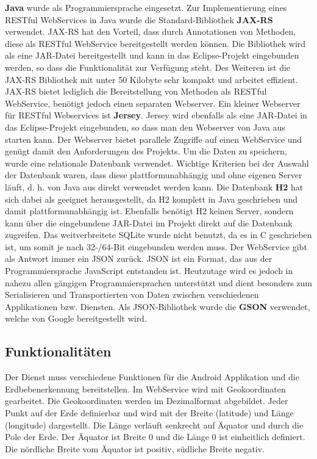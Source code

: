 \textbf{Java} wurde als Programmiersprache eingesetzt. Zur Implementierung eines RESTful WebServices in Java wurde die Standard-Bibliothek \textbf{JAX-RS} verwendet. JAX-RS hat den Vorteil, dass durch Annotationen von Methoden, diese als RESTful WebService bereitgestellt werden können. Die Bibliothek wird als eine JAR-Datei bereitgestellt und kann in das Eclipse-Projekt eingebunden werden, so dass die Funktionalität zur Verfügung steht. Des Weiteren ist die JAX-RS Bibliothek mit unter 50 Kilobyte sehr kompakt und arbeitet effizient. JAX-RS bietet lediglich die Bereitstellung von Methoden als RESTful WebService, benötigt jedoch einen separaten Webserver. Ein kleiner Webserver für RESTful Webservices ist \textbf{Jersey}. Jersey wird ebenfalls als eine JAR-Datei in das Eclipse-Projekt eingebunden, so dass man den Webserver von Java aus starten kann. Der Webserver bietet parallele Zugriffe auf einen WebService und genügt damit den Anforderungen des Projekts. Um die Daten zu speichern, wurde eine relationale Datenbank verwendet. Wichtige Kriterien bei der Auswahl der Datenbank waren, dass diese plattformunabhängig und ohne eigenen Server läuft, d. h. von Java aus direkt verwendet werden kann. Die Datenbank \textbf{H2} hat sich dabei als geeignet herausgestellt, da H2 komplett in Java geschrieben und damit plattformunabhängig ist. Ebenfalls benötigt H2 keinen Server, sondern kann über die eingebundene JAR-Datei im Projekt direkt auf die Datenbank zugreifen. Das weitverbreitete SQLite wurde nicht benutzt, da es in C geschrieben ist, um somit je nach 32-/64-Bit eingebunden werden muss. Der WebService gibt als Antwort immer ein JSON zurück. JSON ist ein Format, das aus der Programmiersprache JavaScript entstanden ist. Heutzutage wird es jedoch in nahezu allen gängigen Programmiersprachen unterstützt und dient besonders zum Serialisieren und Transportierten von Daten zwischen verschiedenen Applikationen bzw. Diensten. Als JSON-Bibliothek wurde die \textbf{GSON} verwendet, welche von Google bereitgestellt wird.


\subsection{Funktionalitäten}
Der Dienst muss verschiedene Funktionen für die Android Applikation und die Erdbebenerkennung bereitstellen. Im WebService wird mit Geokoordinaten gearbeitet. Die Geokoordinaten werden im Dezimalformat abgebildet. Jeder Punkt auf der Erde definierbar und wird mit der Breite (latitude) und Länge (longitude) dargestellt. Die Länge verläuft senkrecht auf Äquator und durch die Pole der Erde. Der Äquator ist Breite 0 und die Länge 0 ist einheitlich  definiert. Die nördliche Breite vom Äquator ist positiv, südliche Breite negativ. 

